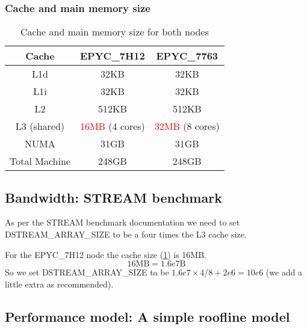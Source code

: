 \documentclass[unicode,11pt,a4paper,oneside,numbers=endperiod,openany]{scrartcl}
\begin{document}
\subsubsection{Cache and main memory size}


\begin{table}[h]
    \centering
    \begin{tabular}{|c|c|c|}
        \hline

        \textbf{Cache} & \textbf{EPYC\_7H12}             & \textbf{EPYC\_7763}             \\
        \hline
        L1d            & 32KB                            & 32KB                            \\
        \hline
        L1i            & 32KB                            & 32KB                            \\
        \hline
        L2             & 512KB                           & 512KB                           \\
        \hline
        L3 (shared)    & \textcolor{red}{16MB} (4 cores) & \textcolor{red}{32MB} (8 cores) \\
        \hline
        NUMA           & 31GB                            & 31GB                            \\
        \hline
        Total Machine  & 248GB                           & 248GB                           \\
        \hline
    \end{tabular}
    \caption{Cache and main memory size for both nodes}
    \label{tab:cache_main_memory}
\end{table}


\subsection{Bandwidth: STREAM benchmark}

As per the STREAM benchmark documentation we need to set DSTREAM\_ARRAY\_SIZE to be a four times the L3 cache size.

For the EPYC\_7H12 node the cache size (\ref{tab:cache_main_memory}) is 16MB. $$16\text{MB} = 1.6e7\text{B}$$ So we set DSTREAM\_ARRAY\_SIZE to be $1.6e7 \times 4 / 8 + 2e6 = 10e6$ (we add a little extra as recommended).



\subsection{Performance model: A simple roofline model}
\end{document}
